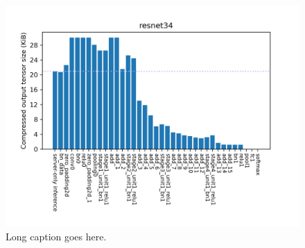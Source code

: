 \begin{figure}[htb]
  \centering
  \includegraphics[width=0.8\linewidth]{img/sample.png}
  \caption[Short caption for table of contents goes here.]{%
    Long caption goes here.%
  }
  \label{fig:sample_figure}
\end{figure}
